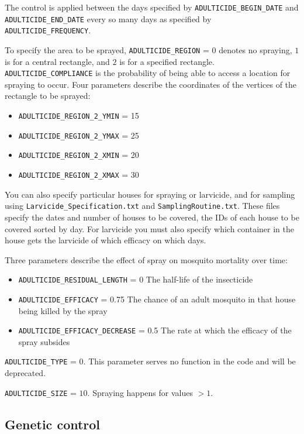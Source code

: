 \documentclass[11pt]{article}
\newcommand{\linecmd}[1]{\texttt{#1}}
\begin{document}
The control is applied between the days specified by \linecmd{ADULTICIDE\_BEGIN\_DATE} and \linecmd{ADULTICIDE\_END\_DATE} every so many days as specified by \linecmd{ADULTICIDE\_FREQUENCY}.

To specify the area to be sprayed, \linecmd{ADULTICIDE\_REGION} = $0$ denotes no spraying, $1$ is for a central rectangle, and $2$ is for a specified rectangle. \linecmd{ADULTICIDE\_COMPLIANCE} is the probability of being able to access a location for spraying to occur. Four parameters describe the coordinates of the vertices of the rectangle to be sprayed:
\begin{itemize}
	\item \linecmd{ADULTICIDE\_REGION\_2\_YMIN} = 15
	\item \linecmd{ADULTICIDE\_REGION\_2\_YMAX} = 25
	\item \linecmd{ADULTICIDE\_REGION\_2\_XMIN} = 20
	\item \linecmd{ADULTICIDE\_REGION\_2\_XMAX} = 30
\end{itemize}

You can also specify particular houses for spraying or larvicide, and for sampling using \linecmd{Larvicide\_Specification.txt} and \linecmd{SamplingRoutine.txt}. These files specify the dates and number of houses to be covered, the IDs of each house to be covered sorted by day. For larvicide you must also specify which container in the house gets the larvicide of which efficacy on which days.


Three parameters describe the effect of spray on mosquito mortality over time:
\begin{itemize}
	\item \linecmd{ADULTICIDE\_RESIDUAL\_LENGTH} = 0 The half-life of the insecticide
	\item \linecmd{ADULTICIDE\_EFFICACY} = 0.75 The chance of an adult mosquito in that house being killed by the spray
	\item \linecmd{ADULTICIDE\_EFFICACY\_DECREASE} = 0.5 The rate at which the efficacy of the spray subsides
\end{itemize}

\linecmd{ADULTICIDE\_TYPE} = $0$. This parameter serves no function in the code and will be deprecated.

\linecmd{ADULTICIDE\_SIZE} = $10$. Spraying happens for values $>1$.

\subsection{Genetic control}
\end{document}
